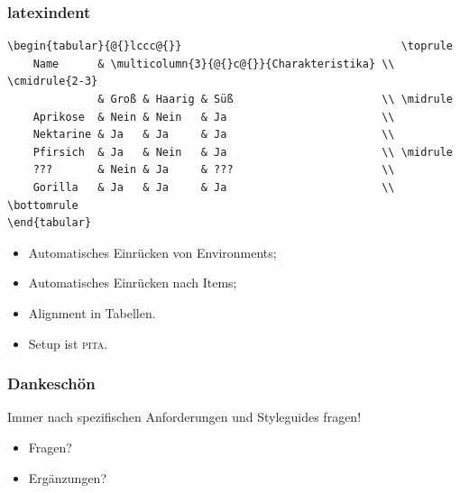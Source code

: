 \documentclass{beamer}
\makeatletter
\def\beamer@writeslidentry@miniframesoff{%
    \expandafter\beamer@ifempty\expandafter{\beamer@framestartpage}{}%
    {%
        \clearpage\beamer@notesactions%
    }
}
\newcommand*{\miniframesoff}{\let\beamer@writeslidentry=\beamer@writeslidentry@miniframesoff}
\makeatother
\begin{document}
\begin{frame}[fragile]
    \frametitle{latexindent}
    \begin{lstlisting}[basicstyle=\ttfamily\scriptsize]
\begin{tabular}{@{}lccc@{}}                                  \toprule
    Name      & \multicolumn{3}{@{}c@{}}{Charakteristika} \\ \cmidrule{2-3}
              & Groß & Haarig & Süß                       \\ \midrule
    Aprikose  & Nein & Nein   & Ja                        \\
    Nektarine & Ja   & Ja     & Ja                        \\
    Pfirsich  & Ja   & Nein   & Ja                        \\ \midrule
    ???       & Nein & Ja     & ???                       \\
    Gorilla   & Ja   & Ja     & Ja                        \\ \bottomrule
\end{tabular}
    \end{lstlisting}
    \begin{itemize}
        \item Automatisches Einrücken von Environments;
        \item Automatisches Einrücken nach Items;
        \item Alignment in Tabellen.
        \item Setup ist \textsc{pita}.
    \end{itemize}
\end{frame}

\appendix
\miniframesoff
\begin{frame}[fragile]
    \frametitle{Dankeschön}
    Immer nach spezifischen Anforderungen und Styleguides fragen!\\[4ex]

    \begin{itemize}
        \item Fragen?
        \item Ergänzungen?
    \end{itemize}

\end{frame}

\newcommand{\roundpanda}[2][0ex]{%
    \begin{tikzpicture}
        \begin{scope}
            \clip [rounded corners=#1] (0,0) rectangle coordinate (centerpoint) (.24\linewidth,.24\linewidth);
            \node [inner sep=0pt] at (centerpoint) {\texttt{[image: images/pandas/\#2]}};
        \end{scope}
    \end{tikzpicture}%
}
\end{document}
